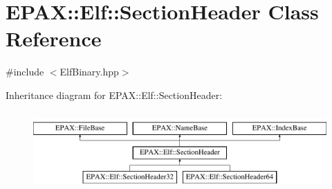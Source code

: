 \hypertarget{class_e_p_a_x_1_1_elf_1_1_section_header}{\section{\-E\-P\-A\-X\-:\-:\-Elf\-:\-:\-Section\-Header \-Class \-Reference}
\label{class_e_p_a_x_1_1_elf_1_1_section_header}
}


{\ttfamily \#include $<$\-Elf\-Binary.\-hpp$>$}

\-Inheritance diagram for \-E\-P\-A\-X\-:\-:\-Elf\-:\-:\-Section\-Header\-:\begin{figure}[H]
\begin{center}
\leavevmode
\includegraphics[height=3.000000cm]{class_e_p_a_x_1_1_elf_1_1_section_header}
\end{center}
\end{figure}
